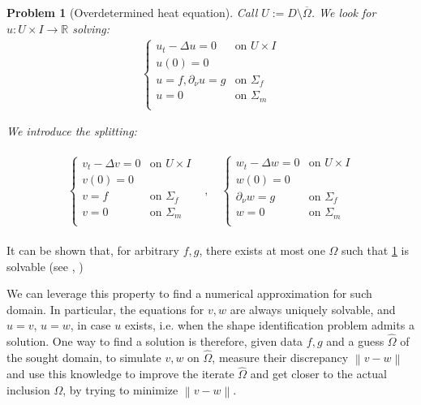 \documentclass[english,a4paper,9pt,oneside]{scrbook}	%
\theoremstyle{break}
\newtheorem{pb}[equation]{Problem}
\theoremstyle{remark}
\newcommand{\mR}{\mathbb{R}}
\newcommand{\norm}[1]{\left\lVert#1\right\rVert}
\begin{document}
\begin{pb}[Overdetermined heat equation]
\label{pb:pdes}
Call $U:=D\setminus \overline{\Omega}$. We look for $u:U \times I \rightarrow \mR$ solving:
\begin{align*}
\left\{\begin{matrix}
u_t -\Delta u=0 & \text{on }U\times I \\ 
u(0)=0 & \\ 
u = f, \partial_\nu u=g & \text{on }\Sigma_f\\
u = 0 & \text{on }\Sigma_m\\
\end{matrix}\right.
\end{align*}

We introduce the splitting:

\begin{align*}
\begin{matrix}
\left\{\begin{matrix}
v_t -\Delta v=0 & \text{on }U\times I \\ 
v(0)=0 & \\ 
v = f& \text{on }\Sigma_f\\
v = 0 & \text{on }\Sigma_m\\
\end{matrix}\right. &, \quad  \left\{\begin{matrix}
w_t -\Delta w=0 & \text{on }U\times I \\ 
w(0)=0 & \\ 
\partial_\nu w=g & \text{on }\Sigma_f\\
w = 0 & \text{on }\Sigma_m\\
\end{matrix}\right.
\end{matrix}
\end{align*}
\end{pb}

It can be shown that, for arbitrary $f,g$, there exists at most one $\Omega$ such that \cref{pb:pdes} is solvable (see \cite{chapko1}, \cite{chapko2})


We can leverage this property to find a numerical approximation for such domain.
In particular, the equations for $v,w$ are always uniquely solvable, and $u=v$, $u=w$, in case $u$ exists, i.e. when the shape identification problem admits a solution. One way to find a solution is therefore, given data $f,g$ and a guess $\hat{\Omega}$ of the sought domain, to simulate $v,w$ on $\hat{\Omega}$, measure their discrepancy $\norm{v-w}$ and use this knowledge to improve the iterate $\hat{\Omega}$ and get closer to the actual inclusion $\Omega$, by trying to minimize $\norm{v-w}$.
\end{document}
